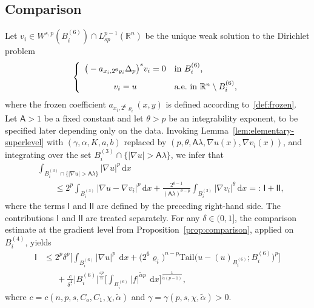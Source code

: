 \documentclass[10pt,letterpaper]{amsart}
\theoremstyle{definition}
\numberwithin{theorem}{section}
\numberwithin{equation}{section}
\newcommand{\R}{\ensuremath{\mathbb{R}}}
\newcommand{\1}{\ensuremath{\mathds{1}}}
\newcommand{\dx}{\mathrm{d}x}
\newcommand\sfI{{\boldsymbol{\mathsf I}}}
\renewcommand{\epsilon}{\varepsilon}
\renewcommand{\rho}{\varrho}
\renewcommand{\epsilon}{\varepsilon}
\renewcommand{\rho}{\varrho}
\renewcommand{\d}{\:\! \mathrm{d}}
\numberwithin{equation}{section}
\begin{document}
\subsection{Comparison}
Let $v_i\in W^{s,p}(B_i^{(6)}) \cap L^{p-1}_{sp} (\R^n)$ be the unique weak solution to the Dirichlet problem
\begin{equation*} 
\left\{
\begin{array}{cl}
      \big(- a_{x_i,2^6\rho_i}\Delta_p\big)^s v_i  = 0 
      & 
      \mbox{in $ B_i^{(6)}$,} \\[7pt]
      v_i = u & \mbox{a.e.~in $\R^n \setminus B_i^{(6)}$,}
   \end{array}
\right.
\end{equation*}
where the frozen coefficient $a_{x_i,2^6\rho_i}(x,y)$ is defined according to~\eqref{def:frozen}. 
Let \(\mathsf A>1\) be a fixed constant and let \(\theta>p\) be an
integrability exponent, to be specified later depending only on the
data.
Invoking Lemma~\ref{lem:elementary-superlevel} with
\((\gamma,\alpha,K,a,b)\) replaced by
\((p,\theta,\mathsf A\lambda,\nabla u(x),\nabla v_i(x))\), and integrating
over the set
\(B_i^{(3)}\cap\{|\nabla u|>\mathsf A\lambda\}\), we infer that
\begin{align}\label{eq:grad-u-superlevel}\nonumber
    &\int_{B_i^{(3)}\cap\{|\nabla u|>\mathsf A\lambda\}} |\nabla u|^p \,\dx \\ 
    &\qquad\le
    2^{p}\int_{B_i^{(3)}} |\nabla u-\nabla v_i|^p \,\dx
    +
    \frac{2^{\theta-1}}{(\mathsf A\lambda)^{\theta-p}}
    \int_{B_i^{(3)}} |\nabla v_i|^{\theta} \,\dx =:\,\sfI+\sfI\sfI,
\end{align}
where the terms \(\sfI\) and \(\sfI\sfI\) are defined by the
preceding right-hand side. The contributions \(\sfI\) and \(\sfI\sfI\) are treated
separately.
For any \(\delta\in(0,1]\), the comparison estimate at the gradient level
from Proposition~\ref{prop:comparison}, applied on \(B_i^{(4)}\), yields
\begin{align*}
    \sfI
    &\leq 
    2^p \delta^p
    \bigg[ 
    \int_{B_i^{(6)}}|\nabla u|^p\,\d x
    + 
    \big(2^6\rho_i\big)^{n -p} \mathrm{Tail} 
    \big(u-(u)_{B_i^{(6)}};B_i^{(6)}
    \big)^p \bigg]\\
    &\phantom{\le\,}
    + 
    \frac{c}{\delta^\frac{p}{\gamma}} \big|B_i^{(6)}\big|^{\frac{\epsilon p}{n}}
    \bigg[\int_{B_i^{(6)}}
    |f|^{\tilde\alpha p}\,\d x \bigg]^{\frac{1}{\tilde\alpha(p-1)}},
\end{align*}
where $c=c(n,p,s,C_o,C_1,\chi,\tilde\alpha)$ and $\gamma = \gamma(p,s,\chi,\tilde{\alpha})>0$. 
\end{document}

